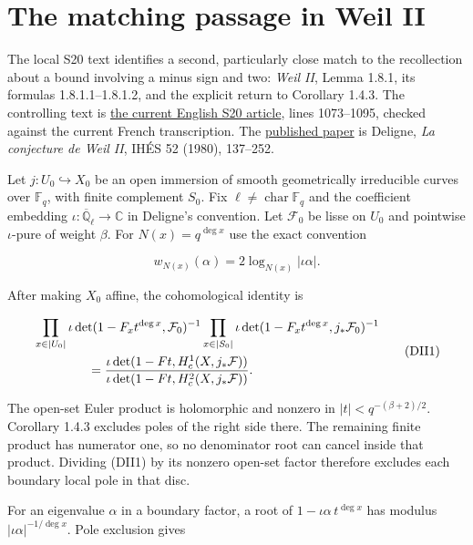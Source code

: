\section{The matching passage in Weil
II}\label{the-matching-passage-in-weil-ii}

The local S20 text identifies a second, particularly close match to the
recollection about a bound involving a minus sign and two: \emph{Weil
II}, Lemma 1.8.1, its formulas 1.8.1.1--1.8.1.2, and the explicit return
to Corollary 1.4.3. The controlling text is
\href{workspace:/output/Deligne_Weil_II_S20_LaTeX/typed_latex/S20_EN_article_text.txt}{the
current English S20 article}, lines 1073--1095, checked against the
current French transcription. The
\href{https://archive.numdam.org/articles/10.1007/BF02684780/}{published
paper} is Deligne, \emph{La conjecture de Weil II}, IHÉS 52 (1980),
137--252.

Let \(j:U_0\hookrightarrow X_0\) be an open immersion of smooth
geometrically irreducible curves over \(\mathbb F_q\), with finite
complement \(S_0\). Fix \(\ell\ne\operatorname{char}\mathbb F_q\) and
the coefficient embedding
\(\iota:\overline{\mathbb Q}_\ell\to\mathbb C\) in Deligne's convention.
Let \(\mathcal F_0\) be lisse on \(U_0\) and pointwise \(\iota\)-pure of
weight \(\beta\). For \(N(x)=q^{\deg x}\) use the exact convention

\[w_{N(x)}(\alpha)=2\log_{N(x)}|\iota\alpha|.\]

After making \(X_0\) affine, the cohomological identity is

\[\begin{aligned}
&\prod_{x\in|U_0|}\iota\det(1-F_xt^{\deg x},\mathcal F_0)^{-1}
\prod_{x\in|S_0|}\iota\det(1-F_xt^{\deg x},j_*\mathcal F_0)^{-1}\\
&\hspace{15mm}=\frac{\iota\det(1-Ft,H_c^1(X,j_*\mathcal F))}
 {\iota\det(1-Ft,H_c^2(X,j_*\mathcal F))}.
\end{aligned}\tag{DII1}\]

The open-set Euler product is holomorphic and nonzero in
\(|t|<q^{-(\beta+2)/2}\). Corollary 1.4.3 excludes poles of the right
side there. The remaining finite product has numerator one, so no
denominator root can cancel inside that product. Dividing (DII1) by its
nonzero open-set factor therefore excludes each boundary local pole in
that disc.

For an eigenvalue \(\alpha\) in a boundary factor, a root of
\(1-\iota\alpha\,t^{\deg x}\) has modulus \(|\iota\alpha|^{-1/\deg x}\).
Pole exclusion gives

